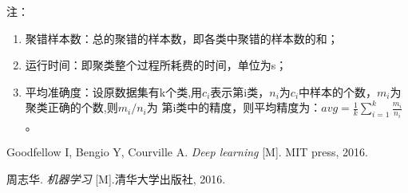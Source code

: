 注：
\begin{enumerate}\itemsep0em 
		\item 聚错样本数：总的聚错的样本数，即各类中聚错的样本数的和；  
		\item 运行时间：即聚类整个过程所耗费的时间，单位为s；  
		\item 平均准确度：设原数据集有k个类,用$c_i$表示第i类，$n_i$为$c_i$中样本的个数，$m_i$为聚类正确的个数,则$m_i/n_i$为 第i类中的精度，则平均精度为：$avg=\frac{1}{k}\sum_{i=1}^{k}\frac{m_{i}}{n_{i}}$。  
\end{enumerate}

\begin{thebibliography}{9}

Goodfellow I, Bengio Y, Courville A.
{\it Deep learning}
[M]. MIT press, 2016.  

周志华.
{\it 机器学习}
[M].清华大学出版社, 2016. 
 
% 
\end{thebibliography}



%
%
%
%
%
